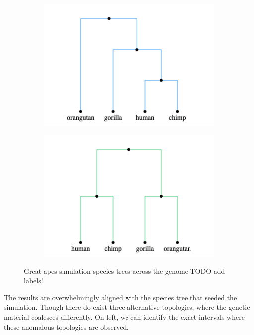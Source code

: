 \documentclass{article}
\begin{document}
\begin{figure}[H]
\begin{minipage}{.48\textwidth}
\begin{minipage}{.4\textwidth}
\begin{subfigure}[b]{\linewidth}
            \end{subfigure}
        \end{minipage}
        \begin{minipage}{.4\textwidth}
            \begin{subfigure}[b]{\linewidth}
                \includegraphics[scale=0.3]{tree_2.png}
            \end{subfigure}
            \begin{subfigure}[b]{\linewidth}
                \includegraphics[scale=0.3]{tree_3.png}
            \end{subfigure}
        \end{minipage}
        \centering
    \end{minipage}
    \centering
    \caption{Great apes simulation species trees across the genome TODO add labels!}
    \label{fig:great_apes}
\end{figure}

The results are overwhelmingly aligned with the species tree that seeded the
simulation. Though there do exist three alternative topologies, where the
genetic material coalesces differently. On left, we can identify the exact
intervals where these anomalous topologies are observed.
\end{document}
